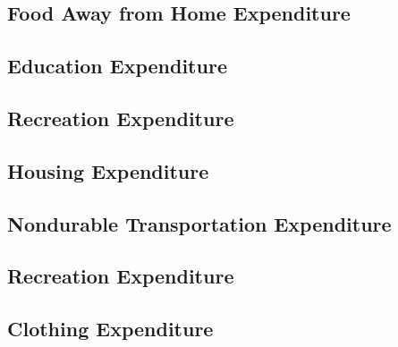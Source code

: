 \documentclass[a4paper,landscape]{article}
\begin{document}
\subsection{Food Away from Home Expenditure}

\clearpage

\subsection{Education Expenditure}

\clearpage

\subsection{Recreation Expenditure}

\clearpage

\subsection{Housing Expenditure}

\clearpage

\subsection{Nondurable Transportation Expenditure}

\clearpage

\subsection{Recreation Expenditure}

\clearpage

\subsection{Clothing Expenditure}

\clearpage
\end{document}
